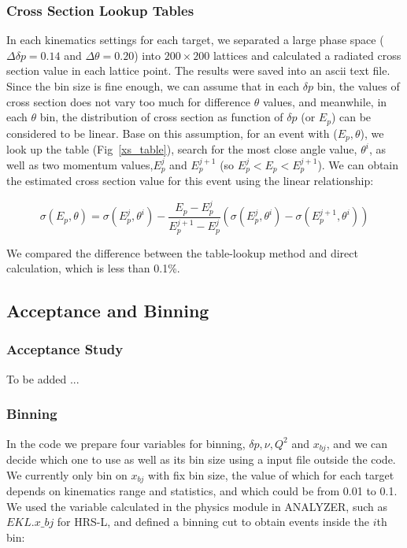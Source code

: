 \subsubsection{Cross Section Lookup Tables} 
 In each kinematics settings for each target, we separated a large phase space ($\Delta\delta p=0.14$ and $\Delta\theta=0.20$) into $200 \times 200$ lattices and calculated a radiated cross section value in each lattice point. The results were saved into an ascii text file. Since the bin size is fine enough, we can assume that in each $\delta p$ bin, the values of cross section does not vary too much for difference $\theta$ values, and meanwhile, in each $\theta$ bin, the distribution of cross section as function of $\delta p$ (or $E_{p}$) can be considered to be linear. Base on this assumption, for an event with ($E_{p}, \theta$), we look up the table (Fig~\ref{xs_table}), search for the most close angle value, $\theta^{i}$, as well as two momentum values,$E_{p}^{j}$ and $E_{p}^{j+1}$ (so $E_{p}^{j}<E_{p}<E_{p}^{j+1}$). We can obtain the estimated cross section value for this event using the linear relationship:

\begin{equation}
 \sigma(E_{p},\theta) = \sigma(E_{p}^{j},\theta^{i}) - \frac{E_{p}-E_{p}^{j}}{E_{p}^{j+1}-E_{p}^{j}}(\sigma(E_{p}^{j},\theta^{i})-\sigma(E_{p}^{j+1},\theta^{i}))
\end{equation}
 
We compared the difference between the table-lookup method and direct calculation, which is less than 0.1\%. 

\subsection{Acceptance and Binning}

\subsubsection{Acceptance Study}
To be added ...

\subsubsection{Binning}
In the code we prepare four variables for binning, $\delta p, \nu, Q^{2}$ and $x_{bj}$, and we can decide which one to use as well as its bin size using a input file outside the code.  We currently only bin on $x_{bj}$ with fix bin size, the value of which for each target depends on kinematics range and statistics, and which could be from 0.01 to 0.1. We used the variable calculated in the physics module in ANALYZER, such as $EKL.x\_bj$ for HRS-L, and defined a binning cut to obtain events inside the $i$th bin:

